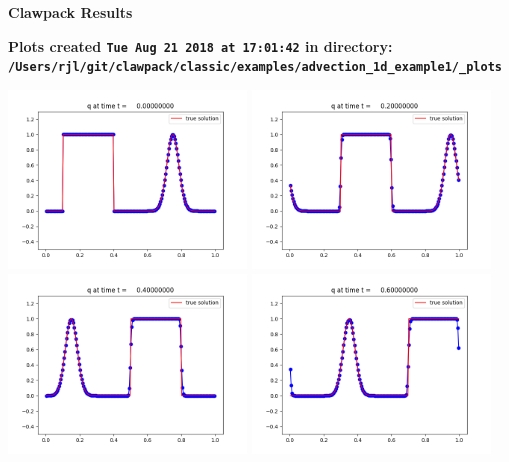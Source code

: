 \documentclass[11pt]{article}
\begin{document}
        \begin{center}{\Large\bf Clawpack Results}\vskip 5pt
        
        \bf Plots created {\tt Tue Aug 21 2018 at 17:01:42} in directory: \vskip 5pt
        \verb+/Users/rjl/git/clawpack/classic/examples/advection_1d_example1/_plots+
        \end{center}
        \vskip 5pt
        \includegraphics[width=0.475\textwidth]{frame0000fig1.png}
\vskip 10pt 
\includegraphics[width=0.475\textwidth]{frame0001fig1.png}
\vskip 10pt 
\includegraphics[width=0.475\textwidth]{frame0002fig1.png}
\vskip 10pt 
\includegraphics[width=0.475\textwidth]{frame0003fig1.png}
\end{document}

